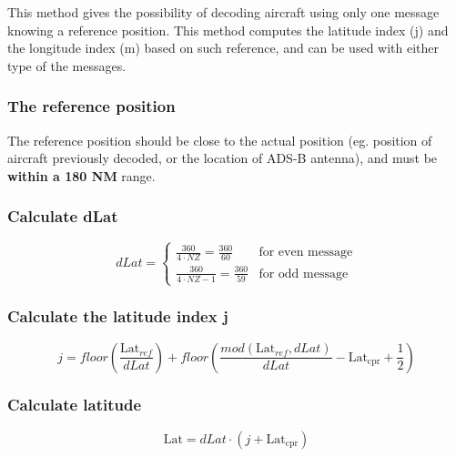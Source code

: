 This method gives the possibility of decoding aircraft using only one message knowing a reference position. This method computes the latitude index (j) and the longitude index (m) based on such reference, and can be used with either type of the messages.

\subsubsection{The reference position}\label{the-reference-position}

The reference position should be close to the actual position (eg. position of aircraft previously decoded, or the location of ADS-B antenna), and must be \textbf{within a 180 NM} range.

\subsubsection{Calculate dLat}\label{calculate-dlat}

\begin{equation}
  dLat =
  \begin{cases}
   \frac{360}{4 \cdot NZ} = \frac{360}{60}          & \text{for even message}  \\
   \frac{360}{4 \cdot NZ - 1}  = \frac{360}{59}     & \text{for odd message}
  \end{cases}
\end{equation}

\subsubsection{Calculate the latitude index j} \label{calculate-the-latitude-index-j-1}

\begin{equation}
  j = floor \left (\frac{\mathrm{Lat}_{ref}}{dLat} \right) + floor \left( \frac{mod(\mathrm{Lat}_{ref}, dLat)}{dLat}  - \mathrm{Lat}_\mathrm{cpr}  + \frac{1}{2} \right)
\end{equation}

\subsubsection{Calculate latitude}\label{calculate-latitude-1}

\begin{equation}
  \mathrm{Lat} = dLat \cdot (j + \mathrm{Lat}_\mathrm{cpr})
\end{equation}


